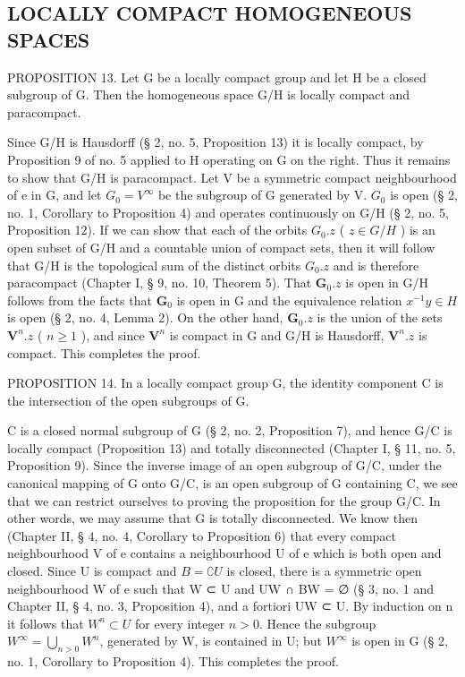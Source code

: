 \subsection{LOCALLY COMPACT HOMOGENEOUS SPACES}

PROPOSITION 13. Let G be a locally compact group and let H be a closed subgroup of G. Then the homogeneous space G/H is locally compact and paracompact.

Since G/H is Hausdorff (§ 2, no. 5, Proposition 13) it is locally compact, by Proposition 9 of no. 5 applied to H operating on G on the right. Thus it remains to show that G/H is paracompact. Let V be a symmetric compact neighbourhood of e in G, and let \(G_{0}=V^{\infty}\) be the subgroup of G generated by V. \(G_{0}\) is open (§ 2, no. 1, Corollary to Proposition 4) and operates continuously on G/H (§ 2, no. 5, Proposition 12). If we can show that each of the orbits \(G_{0}.z\) ( \(z\in G/H\) ) is an open subset of G/H and a countable union of compact sets, then it will follow that G/H is the topological sum of the distinct orbits \(G_{0}.z\) and is therefore paracompact (Chapter I, § 9, no. 10, Theorem 5). That \(\mathbf{G}_0.z\) is open in G/H follows from the facts that \(\mathbf{G}_0\) is open in G and the equivalence relation \(x^{-1}y\in H\) is open (§ 2, no. 4, Lemma 2). On the other hand, \(\mathbf{G}_0.z\) is the union of the sets \(\mathbf{V}^n.z\) ( \(n\geqslant 1\) ), and since \(\mathbf{V}^n\) is compact in G and G/H is Hausdorff, \(\mathbf{V}^n.z\) is compact. This completes the proof.

PROPOSITION 14. In a locally compact group G, the identity component C is the intersection of the open subgroups of G.

C is a closed normal subgroup of G (§ 2, no. 2, Proposition 7), and hence G/C is locally compact (Proposition 13) and totally disconnected (Chapter I, § 11, no. 5, Proposition 9). Since the inverse image of an open subgroup of G/C, under the canonical mapping of G onto G/C, is an open subgroup of G containing C, we see that we can restrict ourselves to proving the proposition for the group G/C. In other words, we may assume that G is totally disconnected. We know then (Chapter II, § 4, no. 4, Corollary to Proposition 6) that every compact neighbourhood V of e contains a neighbourhood U of e which is both open and closed. Since U is compact and \(B = \complement U\) is closed, there is a symmetric open neighbourhood W of e such that W ⊂ U and UW ∩ BW = ∅ (§ 3, no. 1 and Chapter II, § 4, no. 3, Proposition 4), and a fortiori UW ⊂ U. By induction on n it follows that \(W^n \subset U\) for every integer \(n > 0\). Hence the subgroup \(W^\infty = \bigcup_{n > 0} W^n\), generated by W, is contained in U; but \(W^\infty\) is open in G (§ 2, no. 1, Corollary to Proposition 4). This completes the proof.

